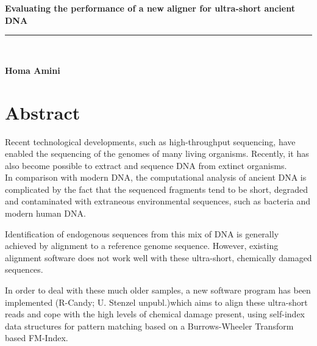 \documentclass[11pt,a4paper]{report}
\makeatletter
\newcommand{\at}{\makeatletter @\makeatother}
\newcommand{\HRule}{\rule{\linewidth}{0.5mm}}
\makeatother
\begin{document}

\begin{titlepage}
{ \huge \bfseries \textbf{Evaluating the performance of a new aligner for ultra-short ancient DNA }}\\[0.2cm]
\HRule \\[0.5cm]
\begin{minipage}{0.9\textwidth}
\begin{flushleft} \large
{\textbf{Homa Amini}}\\
\end{flushleft}
\end{minipage}
\vfill
\end{titlepage}

\newpage\null\thispagestyle{empty}\newpage
\newpage
\newpage

\section*{Abstract}

Recent technological developments, such as high-throughput sequencing,
have enabled the sequencing of the genomes of many living organisms.  
Recently, it has also become possible to extract and sequence DNA from 
extinct organisms.\\ 
In comparison with modern DNA, the computational analysis of ancient DNA
is complicated by the fact that the sequenced fragments tend to be short,
degraded and contaminated with extraneous environmental sequences, such 
as bacteria and modern human DNA.

Identification of endogenous sequences from this mix of DNA is generally
achieved by alignment to a reference genome sequence. However, existing 
alignment software does not work well with these ultra-short, chemically
damaged sequences.

In order to deal with these much older samples, a new software program 
has been implemented (R-Candy; U. Stenzel unpubl.)which aims to align 
these ultra-short reads and cope with the high levels of chemical damage 
present, using self-index data structures for pattern matching based on 
a Burrows-Wheeler Transform based FM-Index.
\end{document}
